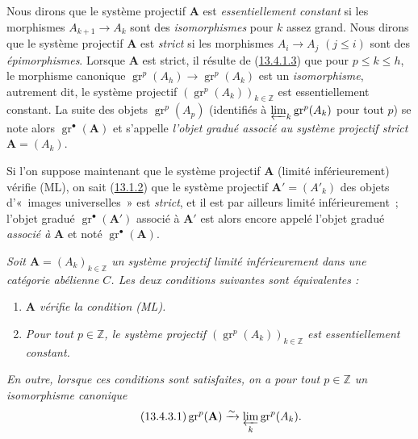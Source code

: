 \begin{env}[13.4.2]
\label{0.13.4.2-fr}
Nous dirons que le système projectif $\mathbf A$ est
\emph{essentiellement constant} si les morphismes
$A_{k+1}\to A_k$ sont des \emph{isomorphismes} pour $k$ assez grand. Nous
dirons que le système projectif $\mathbf A$ est \emph{strict} si les
morphismes $A_i\to A_j$ $(j\leq i)$ sont des \emph{épimorphismes}.
Lorsque $\mathbf A$ est strict, il résulte de
(\hyperref[0.13.4.1.3-fr]{13.4.1.3}) que pour $p\leq k\leq h$, le morphisme
canonique $\operatorname{gr}^p(A_h)\to\operatorname{gr}^p(A_k)$ est un
\emph{isomorphisme}, autrement dit, le système projectif
$(\operatorname{gr}^p(A_k))_{k\in\mathbb Z}$ est essentiellement constant.
La suite des objets $\operatorname{gr}^p(A_p)$ (identifiés à
$\varprojlim_k\operatorname{gr}^p(A_k)$ pour tout $p$) se note alors
$\operatorname{gr}^\bullet(\mathbf A)$ et s'appelle \emph{l'objet gradué
associé au système projectif strict} $\mathbf A=(A_k)$.

Si l'on suppose maintenant que le système projectif $\mathbf A$ (limité
inférieurement) vérifie (ML), on sait
(\hyperref[0.13.1.2-fr]{13.1.2}) que le système projectif
$\mathbf A'=(A'_k)$ des objets d'«~images universelles~» est \emph{strict},
et il est par ailleurs limité inférieurement~; l'objet gradué
$\operatorname{gr}^\bullet(\mathbf A')$ associé à $\mathbf A'$ est alors
encore appelé l'objet gradué \emph{associé à} $\mathbf A$ et noté
$\operatorname{gr}^\bullet(\mathbf A)$.
\end{env}

\begin{proposition}[13.4.3]
\label{0.13.4.3-fr}
\emph{Soit $\mathbf A=(A_k)_{k\in\mathbb Z}$ un système projectif limité
inférieurement dans une catégorie abélienne $C$. Les deux conditions
suivantes sont équivalentes :}
\begin{enumerate}
\item[\emph{a)}] \emph{$\mathbf A$ vérifie la condition (ML).}
\item[\emph{b)}] \emph{Pour tout $p\in\mathbb Z$, le système projectif
$(\operatorname{gr}^p(A_k))_{k\in\mathbb Z}$ est essentiellement constant.}
\end{enumerate}
\emph{En outre, lorsque ces conditions sont satisfaites, on a pour tout
$p\in\mathbb Z$ un isomorphisme canonique}
\begin{equation}
\label{0.13.4.3.1-fr}
\tag{13.4.3.1}
\operatorname{gr}^p(\mathbf A)\xrightarrow{\sim}
\varprojlim_k\operatorname{gr}^p(A_k).
\end{equation}
\end{proposition}

